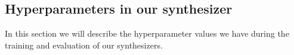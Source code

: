 \documentclass{article}
\begin{document}
\subsection{Hyperparameters in our synthesizer}

In this section we will describe the hyperparameter values we have during the training and evaluation of our synthesizers.

\end{document}

